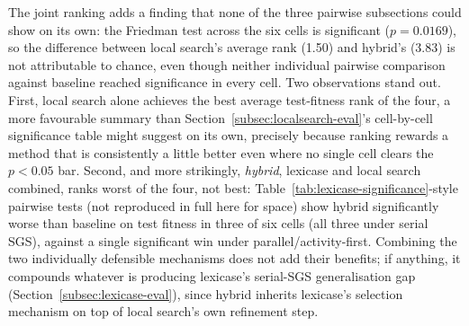 The joint ranking adds a finding that none of the three pairwise
subsections could show on its own: the Friedman test across the six cells
is significant ($p=0.0169$), so the difference between local search's
average rank (1.50) and hybrid's (3.83) is not attributable to chance, even
though neither individual pairwise comparison against baseline reached
significance in every cell. Two observations stand out. First, local
search alone achieves the best average test-fitness rank of the four, a
more favourable summary than Section~\ref{subsec:localsearch-eval}'s
cell-by-cell significance table might suggest on its own, precisely because
ranking rewards a method that is consistently a little better even where
no single cell clears the $p<0.05$ bar. Second, and more strikingly,
\emph{hybrid}, lexicase and local search combined, ranks worst of the four,
not best: Table~\ref{tab:lexicase-significance}-style pairwise tests (not
reproduced in full here for space) show hybrid significantly worse than
baseline on test fitness in three of six cells (all three under serial
SGS), against a single significant win under parallel/activity-first.
Combining the two individually defensible mechanisms does not add their
benefits; if anything, it compounds whatever is producing lexicase's
serial-SGS generalisation gap (Section~\ref{subsec:lexicase-eval}), since
hybrid inherits lexicase's selection mechanism on top of local search's own
refinement step. 

